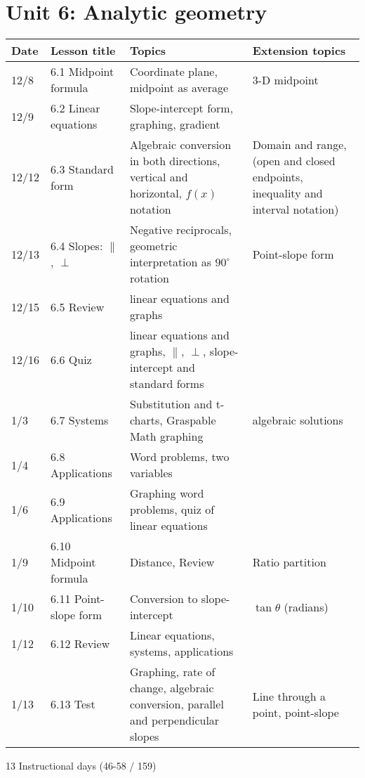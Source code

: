 \section*{Unit 6: Analytic geometry}
\begin{tabular}{|p{0.9cm}|p{4cm}|p{7cm}|p{5cm}|}
  \hline
  Date & Lesson title & Topics  & Extension topics \\
  \hline
  12/8 & 6.1 Midpoint formula & Coordinate plane, midpoint as average & 3-D midpoint \\
  \hline
  12/9 & 6.2 Linear equations & Slope-intercept form, graphing, gradient &  \\
  \hline
  12/12 & 6.3 Standard form & Algebraic conversion in both directions, vertical and horizontal, $f(x)$ notation & Domain and range, (open and closed endpoints, inequality and interval notation) \\
  \hline
  12/13 & 6.4 Slopes: $\parallel$, $\perp$ & Negative reciprocals, geometric interpretation as $90^\circ$ rotation & Point-slope form \\
  \hline
  12/15 & 6.5 Review & linear equations and graphs &  \\
  \hline
  12/16 & 6.6 Quiz & linear equations and graphs, $\parallel$, $\perp$, slope-intercept and standard forms & \\
  \hline
  1/3 & 6.7 Systems & Substitution and t-charts, Graspable Math graphing & algebraic solutions \\
  \hline
  1/4 & 6.8 Applications & Word problems, two variables &  \\
  \hline
  1/6 & 6.9 Applications & Graphing word problems, quiz of linear equations &  \\
  \hline
  1/9 & 6.10 Midpoint formula & Distance, Review & Ratio partition \\
  \hline
  1/10 & 6.11 Point-slope form & Conversion to slope-intercept & $\tan \theta$ (radians) \\
  \hline
  1/12 & 6.12 Review & Linear equations, systems, applications &  \\
  \hline
  1/13 & 6.13 Test & Graphing, rate of change, algebraic conversion, parallel and perpendicular slopes & Line through a point, point-slope \\
  \hline

\end{tabular} \par \vspace*{0.3cm}
13 Instructional days (46-58 / 159)


